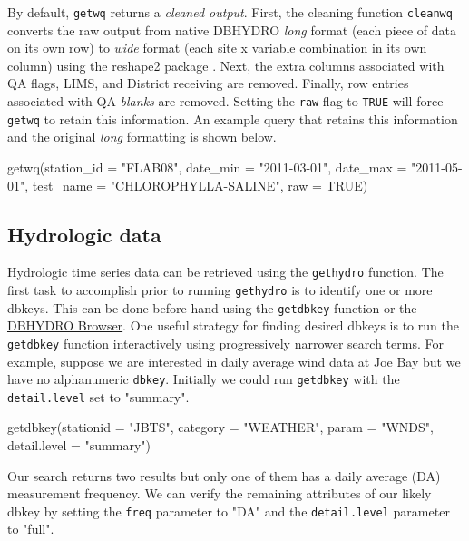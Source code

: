 \documentclass[12pt,notitlepage]{article}
\begin{document}
\noindent By default, \verb|getwq| returns a \textit{cleaned output}. First, the cleaning function \verb|cleanwq| converts the raw output from native DBHYDRO \textit{long} format (each piece of data on its own row) to \textit{wide} format (each site x variable combination in its own column) using the reshape2 package \citep{reshape2}. Next, the extra columns associated with QA flags, LIMS, and District receiving are removed. Finally, row entries associated with QA \textit{blanks} are removed. Setting the \texttt{raw} flag to \texttt{TRUE} will force \verb|getwq| to retain this information. An example query that retains this information and the original \textit{long} formatting is shown below.

\begin{Schunk}
\begin{Sinput}
 getwq(station_id = "FLAB08", date_min = "2011-03-01", 
       date_max = "2011-05-01", test_name = "CHLOROPHYLLA-SALINE",
       raw = TRUE)
\end{Sinput}
\end{Schunk}

\subsection{Hydrologic data}

Hydrologic time series data can be retrieved using the \texttt{gethydro} function. The first task to accomplish prior to running \texttt{gethydro} is to identify one or more dbkeys. This can be done before-hand using the \texttt{getdbkey} function or the \href{http://my.sfwmd.gov/dbhydroplsql/show_dbkey_info.main_menu}{DBHYDRO Browser}. One useful strategy for finding desired dbkeys is to run the \texttt{getdbkey}   function interactively using progressively narrower search terms. For example, suppose we are interested in daily average wind data at Joe Bay but we have no alphanumeric \texttt{dbkey}. Initially we could run \texttt{getdbkey} with the \texttt{detail.level} set to "summary".

\begin{Schunk}
\begin{Sinput}
 getdbkey(stationid = "JBTS", category = "WEATHER", param = "WNDS",
          detail.level = "summary")
\end{Sinput}
\end{Schunk}

\noindent Our search returns two results but only one of them has a daily average (DA) measurement frequency. We can verify the remaining attributes of our likely dbkey by setting the \texttt{freq} parameter to "DA" and the \texttt{detail.level} parameter to "full".
\end{document}
